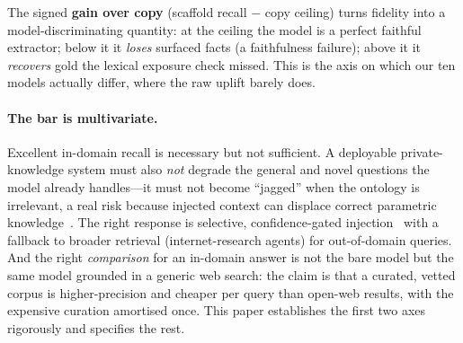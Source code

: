 \documentclass[11pt]{article}
\begin{document}
The signed \textbf{gain over copy} (scaffold recall $-$ copy ceiling) turns fidelity into a
model-discriminating quantity: at the ceiling the model is a perfect faithful extractor; below it
it \emph{loses} surfaced facts (a faithfulness failure); above it it \emph{recovers} gold the
lexical exposure check missed. This is the axis on which our ten models actually differ, where the
raw uplift barely does.

\paragraph{The bar is multivariate.} Excellent in-domain recall is necessary but not sufficient.
A deployable private-knowledge system must also \emph{not} degrade the general and novel questions
the model already handles---it must not become ``jagged'' when the ontology is irrelevant, a real
risk because injected context can displace correct parametric
knowledge~\cite{shi2023distracted,yoran2024robust,longpre2021entity}. The right response is
selective, confidence-gated injection~\cite{mallen2023trust} with a fallback to broader
retrieval (internet-research agents) for out-of-domain queries. And the right \emph{comparison}
for an in-domain answer is not the bare model but the same model grounded in a generic web
search: the claim is that a curated, vetted corpus is higher-precision and cheaper per query
than open-web results, with the expensive curation amortised once. This paper establishes the
first two axes rigorously and specifies the rest.
\end{document}
